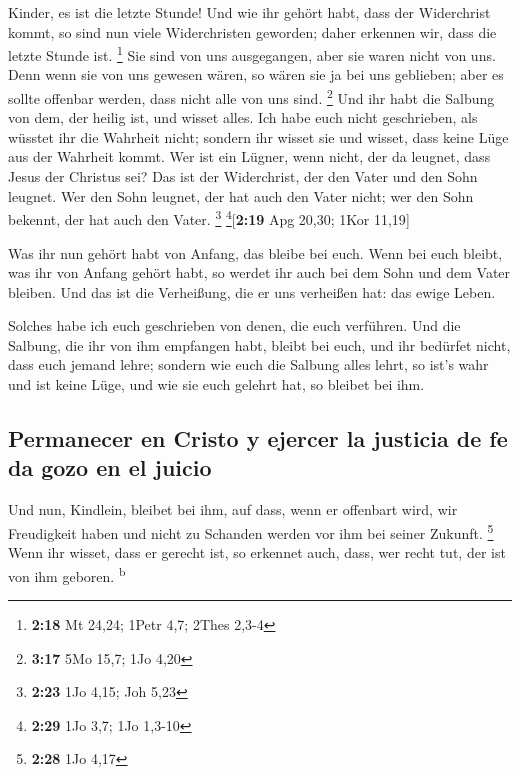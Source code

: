  Kinder, es ist die letzte Stunde! Und wie ihr gehört
habt, dass der Widerchrist kommt, so sind nun viele Widerchristen
geworden; daher erkennen wir, dass die letzte Stunde ist. \footnote{\textbf{2:18}
  Mt 24,24; 1Petr 4,7; 2Thes 2,3-4}  Sie sind von uns
ausgegangen, aber sie waren nicht von uns. Denn wenn sie von uns gewesen
wären, so wären sie ja bei uns geblieben; aber es sollte offenbar
werden, dass nicht alle von uns sind. \footnote{\textbf{3:17} 5Mo 15,7;
  1Jo 4,20}  Und ihr habt die Salbung von dem, der heilig
ist, und wisset alles.  Ich habe euch nicht geschrieben,
als wüsstet ihr die Wahrheit nicht; sondern ihr wisset sie und wisset,
dass keine Lüge aus der Wahrheit kommt.  Wer ist ein
Lügner, wenn nicht, der da leugnet, dass Jesus der Christus sei? Das ist
der Widerchrist, der den Vater und den Sohn leugnet.  Wer
den Sohn leugnet, der hat auch den Vater nicht; wer den Sohn bekennt,
der hat auch den Vater. \footnote{\textbf{2:23} 1Jo 4,15; Joh 5,23}
\footnote{\textbf{2:29} 1Jo 3,7; 1Jo 1,3-10}{[}\textbf{2:19} Apg 20,30;
1Kor 11,19{]}

 Was ihr nun gehört habt von Anfang, das bleibe bei euch.
Wenn bei euch bleibt, was ihr von Anfang gehört habt, so werdet ihr auch
bei dem Sohn und dem Vater bleiben.  Und das ist die
Verheißung, die er uns verheißen hat: das ewige Leben.

 Solches habe ich euch geschrieben von denen, die euch
verführen.  Und die Salbung, die ihr von ihm empfangen
habt, bleibt bei euch, und ihr bedürfet nicht, dass euch jemand lehre;
sondern wie euch die Salbung alles lehrt, so ist's wahr und ist keine
Lüge, und wie sie euch gelehrt hat, so bleibet bei ihm.

\hypertarget{permanecer-en-cristo-y-ejercer-la-justicia-de-fe-da-gozo-en-el-juicio}{%
\subsection{Permanecer en Cristo y ejercer la justicia de fe da gozo en
el
juicio}\label{permanecer-en-cristo-y-ejercer-la-justicia-de-fe-da-gozo-en-el-juicio}}

 Und nun, Kindlein, bleibet bei ihm, auf dass, wenn er
offenbart wird, wir Freudigkeit haben und nicht zu Schanden werden vor
ihm bei seiner Zukunft. \footnote{\textbf{2:28} 1Jo 4,17}
 Wenn ihr wisset, dass er gerecht ist, so erkennet auch,
dass, wer recht tut, der ist von ihm geboren. \textsuperscript{b}

